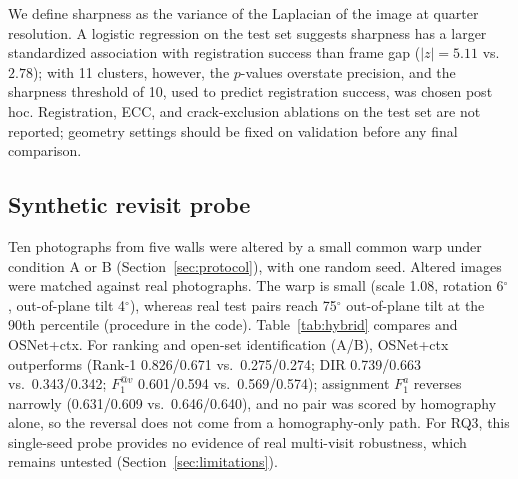 We define sharpness as the variance of the Laplacian of the image at quarter resolution.
A logistic regression on the test set suggests sharpness has a larger standardized association with registration success than frame gap ($|z| = 5.11$ vs.\ $2.78$); with 11 clusters, however, the $p$-values overstate precision, and the sharpness threshold of 10, used to predict registration success, was chosen post hoc.
Registration, ECC, and crack-exclusion ablations on the test set are not reported; geometry settings should be fixed on validation before any final comparison.

\subsection{Synthetic revisit probe}
\label{sec:hybridbench}

Ten photographs from five walls were altered by a small common warp under condition A or B (Section~\ref{sec:protocol}), with one random seed.
Altered images were matched against real photographs. The warp is small (scale 1.08, rotation 6$^{\circ}$, out-of-plane tilt 4$^{\circ}$), whereas real test pairs reach 75$^{\circ}$ out-of-plane tilt at the 90th percentile (procedure in the code).
Table~\ref{tab:hybrid} compares \hybrid{} and OSNet+ctx.
For ranking and open-set identification (A/B), OSNet+ctx outperforms \hybrid{} (Rank-1 0.826/0.671 vs.\ 0.275/0.274; DIR 0.739/0.663 vs.\ 0.343/0.342; $F_1^{@v}$ 0.601/0.594 vs.\ 0.569/0.574); assignment $F_1^{a}$ reverses narrowly (0.631/0.609 vs.\ 0.646/0.640), and no pair was scored by homography alone, so the reversal does not come from a homography-only path.
For RQ3, this single-seed probe provides no evidence of real multi-visit robustness, which remains untested (Section~\ref{sec:limitations}).

